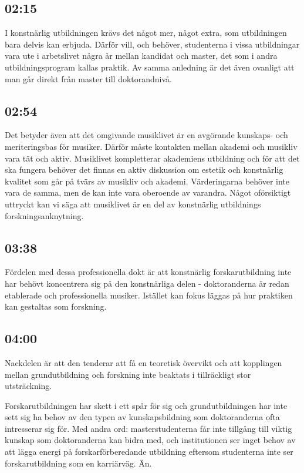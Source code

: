 \documentclass[11pt]{article}
\begin{document}
\subsection*{02:15}
\label{sec:org33e2c42}
I konstnärlig utbildningen krävs det något mer, något extra, som utbildningen bara delvis kan erbjuda. Därför vill, och behöver, studenterna i vissa utbildningar vara ute i arbetslivet några år mellan kandidat och master, det som i andra utbildningsprogram kallas praktik. Av samma anledning är det även ovanligt att man går direkt från master till doktorandnivå.
\subsection*{02:54}
\label{sec:orgc7d2a53}
Det betyder även att det omgivande musiklivet är en avgörande kunskaps- och meriteringsbas för musiker. Därför måste kontakten mellan akademi och musikliv vara tät och aktiv. Musiklivet kompletterar akademiens utbildning och för att det ska fungera behöver det finnas en aktiv diskussion om estetik och konstnärlig kvalitet som går på tvärs av musikliv och akademi. Värderingarna behöver inte vara de samma, men de kan inte vara oberoende av varandra. Något oförsiktigt uttryckt kan vi säga att musiklivet är en del av konstnärlig utbildnings forskningsanknytning.
\subsection*{03:38}
\label{sec:org76767ba}
Fördelen med dessa professionella dokt är att konstnärlig forskarutbildning inte har behövt koncentrera sig på den konstnärliga delen - doktoranderna är redan etablerade och professionella musiker. Istället kan fokus läggas på hur praktiken kan gestaltas som forskning.
\subsection*{04:00}
\label{sec:orgc63daac}
Nackdelen är att den tenderar att få en teoretisk övervikt och att kopplingen mellan grundutbildning och forskning inte beaktats i tillräckligt stor utsträckning.

Forskarutbildningen har skett i ett spår för sig och grundutbildningen har inte sett sig ha behov av den typen av kunskapsbildning som doktoranderna ofta intresserar sig för. Med andra ord: masterstudenterna får inte tillgång till viktig kunskap som doktoranderna kan bidra med, och institutionen ser inget behov av att lägga energi på forskarförberedande utbildning eftersom studenterna inte ser forskarutbildning som en karriärväg. Än.
\end{document}

